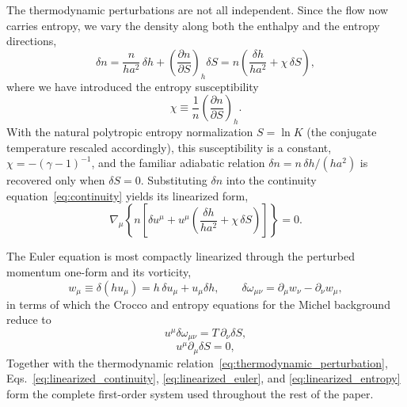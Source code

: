 \documentclass[12pt,a4paper,preprint,nopreprintline]{elsarticle}
\begin{document}
The thermodynamic perturbations are not all independent. Since the flow now carries entropy, we vary the density along both the enthalpy and the entropy directions,
\begin{equation}
    \delta n
    =
    \frac{n}{ha^{2}}\,\delta h
    +\left(\frac{\partial n}{\partial S}\right)_{h}\delta S
    =
    n\left(\frac{\delta h}{ha^{2}}+\chi\,\delta S\right),
    \label{eq:thermodynamic_perturbation}
\end{equation}
where we have introduced the entropy susceptibility
\begin{equation}
    \chi
    \equiv
    \frac{1}{n}\left(\frac{\partial n}{\partial S}\right)_{h}.
    \label{eq:chi_definition}
\end{equation}
With the natural polytropic entropy normalization $S=\ln K$ (the conjugate temperature rescaled accordingly), this susceptibility is a constant, $\chi=-(\gamma-1)^{-1}$, and the familiar adiabatic relation $\delta n=n\,\delta h/(ha^{2})$ is recovered only when $\delta S=0$. Substituting $\delta n$ into the continuity equation~\eqref{eq:continuity} yields its linearized form,
\begin{equation}
    \nabla_{\mu}
    \left\{
        n\left[
            \delta u^{\mu}
            +u^{\mu}\left(
                \frac{\delta h}{ha^{2}}+\chi\,\delta S
            \right)
        \right]
    \right\}
    =0.
    \label{eq:linearized_continuity}
\end{equation}

The Euler equation is most compactly linearized through the perturbed momentum one-form and its vorticity,
\begin{equation}
    w_{\mu}
    \equiv
    \delta(hu_{\mu})
    =
    h\,\delta u_{\mu}+u_{\mu}\delta h,
    \qquad
    \delta\omega_{\mu\nu}
    =
    \partial_{\mu}w_{\nu}-\partial_{\nu}w_{\mu},
    \label{eq:perturbed_momentum}
\end{equation}
in terms of which the Crocco and entropy equations for the Michel background reduce to
\begin{equation}
    u^{\mu}\delta\omega_{\mu\nu}
    =T\,\partial_{\nu}\delta S,
    \label{eq:linearized_euler}
\end{equation}
\begin{equation}
    u^{\mu}\partial_{\mu}\delta S=0,
    \label{eq:linearized_entropy}
\end{equation}
Together with the thermodynamic relation~\eqref{eq:thermodynamic_perturbation}, Eqs.~\eqref{eq:linearized_continuity}, \eqref{eq:linearized_euler}, and \eqref{eq:linearized_entropy} form the complete first-order system used throughout the rest of the paper.
\end{document}

